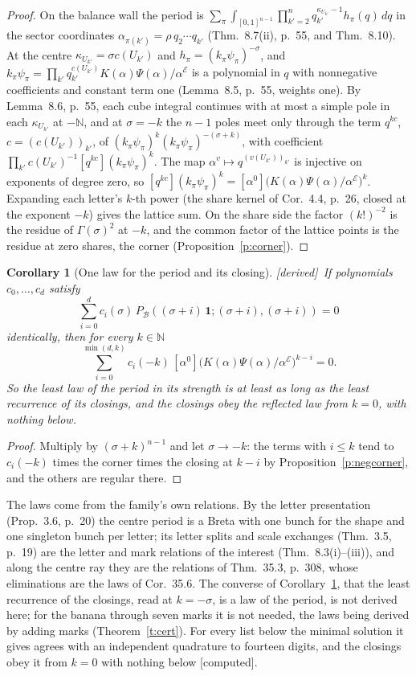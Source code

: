 \documentclass[11pt]{article}
\newcommand{\cE}{\mathcal E}
\newcommand{\cB}{\mathcal B}
\newcommand{\one}{\mathbf 1}
\newcommand{\Pc}[1]{P_{\cB}(#1\,\one;#1,#1)}
\newcommand{\Clo}[1]{[\alpha^0]\big(K(\alpha)\Psi(\alpha)/\alpha^{\cE}\big)^{#1}}
\theoremstyle{plain}
\newtheorem{corollary}[proposition]{Corollary}
\theoremstyle{definition}
\theoremstyle{remark}
\newcommand{\derived}{\textup{[derived]}}
\newcommand{\computed}{\textup{[computed]}}
\begin{document}
\begin{proof}
On the balance wall the period is $\sum_\pi\int_{[0,1]^{n-1}}\prod_{k'=2}^nq_{k'}^{\kappa_{U_{k'}}-1}h_\pi(q)\,dq$ in the sector coordinates $\alpha_{\pi(k')}=\rho\,q_2\cdots q_{k'}$ (Thm.~8.7(ii), p.~55, and Thm.~8.10). At the centre $\kappa_{U_{k'}}=\sigma c(U_{k'})$ and $h_\pi=(k_\pi\psi_\pi)^{-\sigma}$, and $k_\pi\psi_\pi=\prod_{k'}q_{k'}^{c(U_{k'})}K(\alpha)\Psi(\alpha)/\alpha^{\cE}$ is a polynomial in $q$ with nonnegative coefficients and constant term one (Lemma~8.5, p.~55, weights one). By Lemma~8.6, p.~55, each cube integral continues with at most a simple pole in each $\kappa_{U_{k'}}$ at $-\mathbb N$, and at $\sigma=-k$ the $n-1$ poles meet only through the term $q^{kc}$, $c=(c(U_{k'}))_{k'}$, of $(k_\pi\psi_\pi)^k(k_\pi\psi_\pi)^{-(\sigma+k)}$, with coefficient $\prod_{k'}c(U_{k'})^{-1}[q^{kc}](k_\pi\psi_\pi)^k$. The map $\alpha^v\mapsto q^{(v(U_{k'}))_{k'}}$ is injective on exponents of degree zero, so $[q^{kc}](k_\pi\psi_\pi)^k=\Clo k$. Expanding each letter's $k$-th power (the share kernel of Cor.~4.4, p.~26, closed at the exponent $-k$) gives the lattice sum. On the share side the factor $(k!)^{-2}$ is the residue of $\Gamma(\sigma)^2$ at $-k$, and the common factor of the lattice points is the residue at zero shares, the corner (Proposition~\ref{p:corner}).
\end{proof}

\begin{corollary}[One law for the period and its closing]\label{c:law}\derived\
If polynomials $c_0,\dots,c_d$ satisfy
\[
\sum_{i=0}^dc_i(\sigma)\,\Pc{(\sigma+i)}=0
\]
identically, then for every $k\in\mathbb N$
\[
\sum_{i=0}^{\min(d,k)}c_i(-k)\,\Clo{k-i}=0 .
\]
So the least law of the period in its strength is at least as long as the least recurrence of its closings, and the closings obey the reflected law from $k=0$, with nothing below.
\end{corollary}

\begin{proof}
Multiply by $(\sigma+k)^{n-1}$ and let $\sigma\to-k$: the terms with $i\le k$ tend to $c_i(-k)$ times the corner times the closing at $k-i$ by Proposition~\ref{p:negcorner}, and the others are regular there.
\end{proof}

The laws come from the family's own relations. By the letter presentation (Prop.~3.6, p.~20) the centre period is a Breta with one bunch for the shape and one singleton bunch per letter; its letter splits and scale exchanges (Thm.~3.5, p.~19) are the letter and mark relations of the interest (Thm.~8.3(i)--(iii)), and along the centre ray they are the relations of Thm.~35.3, p.~308, whose eliminations are the laws of Cor.~35.6. The converse of Corollary~\ref{c:law}, that the least recurrence of the closings, read at $k=-\sigma$, is a law of the period, is not derived here; for the banana through seven marks it is not needed, the laws being derived by adding marks (Theorem~\ref{t:cert}). For every list below the minimal solution it gives agrees with an independent quadrature to fourteen digits, and the closings obey it from $k=0$ with nothing below \computed.
\end{document}
